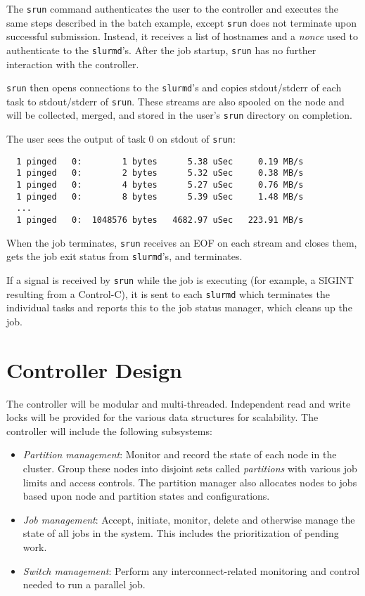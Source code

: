 The {\tt srun} command authenticates the user to the controller and 
executes the same steps described in the batch example, except {\tt srun} 
does not terminate upon successful submission.  Instead, it receives a list of
hostnames and a {\em nonce} used to authenticate to the {\tt slurmd}'s.
After the job startup, {\tt srun} has no further interaction with the 
controller.

{\tt srun} then opens connections to the {\tt slurmd}'s and copies 
stdout/stderr of each task to stdout/stderr of {\tt srun}.  These streams
are also spooled on the node and will be collected, merged, and stored
in the user's {\tt srun} directory on completion.

The user sees the output of task 0 on stdout of {\tt srun}:

\begin{verbatim}
  1 pinged   0:        1 bytes      5.38 uSec     0.19 MB/s                     
  1 pinged   0:        2 bytes      5.32 uSec     0.38 MB/s                     
  1 pinged   0:        4 bytes      5.27 uSec     0.76 MB/s                     
  1 pinged   0:        8 bytes      5.39 uSec     1.48 MB/s                     
  ...
  1 pinged   0:  1048576 bytes   4682.97 uSec   223.91 MB/s              
\end{verbatim}

When the job terminates, {\tt srun} receives an EOF on each stream and
closes them, gets the job exit status from {\tt slurmd}'s, and terminates.

If a signal is received by {\tt srun} while the job is executing (for example,
a SIGINT resulting from a Control-C), it is sent to each {\tt slurmd} which 
terminates the individual tasks and reports this to the job status manager,
which cleans up the job.

\section{Controller Design}

The controller will be modular and multi-threaded. 
Independent read and write locks will be provided for the various data 
structures for scalability. 
The controller  will include the following subsystems:

\begin{itemize}
\item {\em Partition management}: Monitor and record the state of each 
node in the cluster.
Group these nodes into disjoint sets called {\em partitions} with various 
job limits and access controls.
The partition manager also allocates nodes to jobs based upon 
node and partition states and configurations. 

\item {\em Job management}: Accept, initiate, monitor, delete and otherwise 
manage the state of all jobs in the system. This includes the prioritization 
of pending work.

\item {\em Switch management}: Perform any interconnect-related 
monitoring and control needed to run a parallel job.

\end{itemize}

